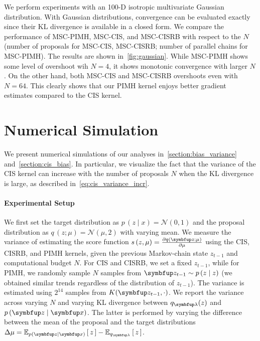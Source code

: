 %
We perform experiments with an 100-D isotropic multivariate Gaussian distribution.
With Gaussian distributions, convergence can be evaluated exactly since their KL divergence is available in a closed form.
We compare the performance of MSC-PIMH, MSC-CIS, and MSC-CISRB with respect to the \(N\) (number of proposals for MSC-CIS, MSC-CISRB; number of parallel chains for MSC-PIMH).
The results are shown in~\cref{fig:gaussian}.
While MSC-PIMH shows some level of overshoot wih \(N=4\), it shows monotonic convergence with larger \(N\).
On the other hand, both MSC-CIS and MSC-CISRB overshoots even with \(N=64\).
This clearly shows that our PIMH kernel enjoys better gradient estimates compared to the CIS kernel.

\section{Numerical Simulation}
We present numerical simulations of our analyses in~\cref{section:bias_variance} and~\cref{section:cis_bias}.
In particular, we visualize the fact that the variance of the CIS kernel can increase with the number of proposals \(N\) when the KL divergence is large, as described in~\eqref{eq:cis_variance_incr}.

\paragraph{Experimental Setup}
We first set the target distribution as \(p\,(z \mid x) = \mathcal{N}(0, 1)\) and the proposal distribution as \(q\,(z; \mu) = \mathcal{N}(\mu, 2)\) with varying mean.
We measure the variance of estimating the score function \(s\,(z, \mu) = \frac{\partial q(\vz; \mu)}{\partial \mu} \) using the CIS, CISRB, and PIMH kernels, given the previous Markov-chain state \(z_{t-1}\) and computational budget \(N\).
For CIS and CISRB, we set a fixed \(z_{t-1}\), while for PIMH, we randomly sample \(N\) samples from \(\vz_{t-1} \sim p\,(z \mid z)\) (we obtained similar trends regardless of the distribution of \(z_{t-1}\)).
The variance is estimated using \(2^{14}\) samples from \(K(\vz_{t-1}, \cdot)\).
We report the variance across varying \(N\) and varying KL divergence between \(q_{\vlambda}(z)\) and \(p\,(\vz\mid\vx)\).
The latter is performed by varying the difference between the mean of the proposal and the target distributions \(\Delta \mu = \Esub{p(\vz\mid\vx)}{z} - \Esub{q_{\vlambda}}{z} \).

